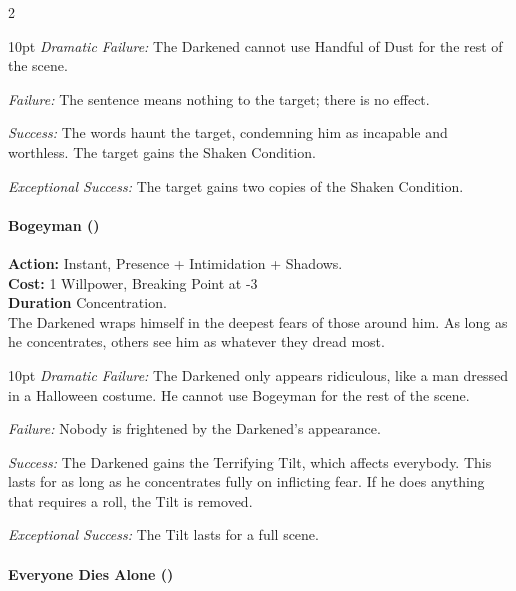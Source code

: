 \begin{multicols}{2}
   \begin{myindentpar}{10pt}  \emph{Dramatic Failure:} The Darkened cannot use Handful of Dust for the rest of the scene.
   
    \emph{Failure:} The sentence means nothing to the target; there is no effect.
    
    \emph{Success:} The words haunt the target, condemning him as incapable and worthless. The target gains the Shaken Condition.
    
    \emph{Exceptional Success:} The target gains two copies of the Shaken Condition.\end{myindentpar}

\paragraph*{Bogeyman (\textbullet\textbullet\textbullet)} 

\noindent \textbf{Action:} Instant, Presence + Intimidation + Shadows. \\

\noindent \textbf{Cost:} 1 Willpower, Breaking Point at -3\\

\noindent \textbf{Duration} Concentration.\\

\noindent The Darkened wraps himself in the deepest fears of those around him. As long as he concentrates, others see him as whatever they dread most.

\begin{myindentpar}{10pt}    \emph{Dramatic Failure:} The Darkened only appears ridiculous, like a man dressed in a Halloween costume. He cannot use Bogeyman for the rest of the scene.

    \emph{Failure:} Nobody is frightened by the Darkened's appearance.
    
    \emph{Success:} The Darkened gains the Terrifying Tilt, which affects everybody. This lasts for as long as he concentrates fully on inflicting fear. If he does anything that requires a roll, the Tilt is removed. 
    
    \emph{Exceptional Success:} The Tilt lasts for a full scene.\end{myindentpar}    
    
\paragraph*{Everyone Dies Alone (\textbullet\textbullet\textbullet\textbullet)}


\end{multicols}
